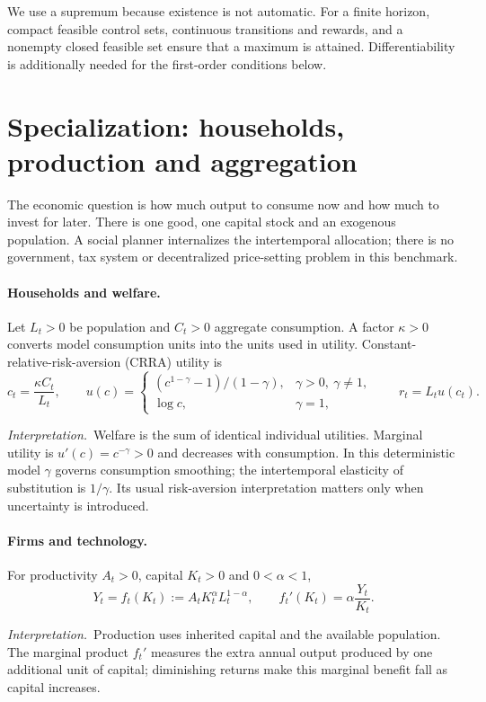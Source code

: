\documentclass[11pt,a4paper]{article}
\newcommand{\interp}{\par\smallskip\noindent\textit{Interpretation.}\ }
\begin{document}
We use a supremum because existence is not automatic. For a finite horizon,
compact feasible control sets, continuous transitions and rewards, and a
nonempty closed feasible set ensure that a maximum is attained.
Differentiability is additionally needed for the first-order conditions below.

\section{Specialization: households, production and aggregation}
The economic question is how much output to consume now and how much to
invest for later. There is one good, one capital stock and an exogenous
population. A social planner internalizes the intertemporal allocation;
there is no government, tax system or decentralized price-setting problem
in this benchmark.

\paragraph{Households and welfare.}
Let $L_t>0$ be population and $C_t>0$ aggregate consumption. A factor
$\kappa>0$ converts model consumption units into the units used in utility.
Constant-relative-risk-aversion (CRRA) utility is
\begin{equation}\label{eq:utility}
 c_t=\frac{\kappa C_t}{L_t},\qquad
 u(c)=
 \begin{cases}
 (c^{1-\gamma}-1)/(1-\gamma),&\gamma>0,\ \gamma\ne1,\\
 \log c,&\gamma=1,
 \end{cases}
 \qquad r_t=L_tu(c_t).
\end{equation}
\interp Welfare is the sum of identical individual utilities.
Marginal utility is $u'(c)=c^{-\gamma}>0$ and decreases with consumption.
In this deterministic model $\gamma$ governs consumption smoothing;
the intertemporal elasticity of substitution is $1/\gamma$. Its usual
risk-aversion interpretation matters only when uncertainty is introduced.

\paragraph{Firms and technology.}
For productivity $A_t>0$, capital $K_t>0$ and $0<\alpha<1$,
\begin{equation}\label{eq:production}
 Y_t=f_t(K_t):=A_tK_t^\alpha L_t^{1-\alpha},
 \qquad f_t'(K_t)=\alpha\frac{Y_t}{K_t}.
\end{equation}
\interp Production uses inherited capital and the available population.
The marginal product $f_t'$ measures the extra annual output produced by
one additional unit of capital; diminishing returns make this marginal
benefit fall as capital increases.
\end{document}
